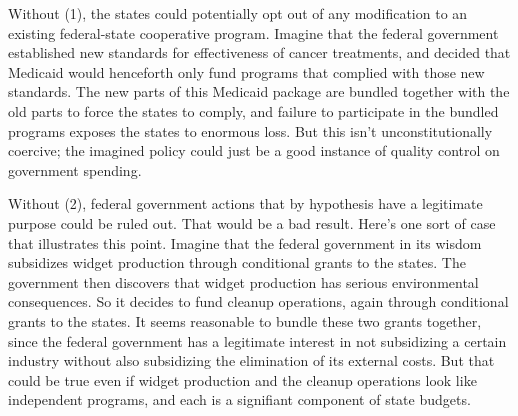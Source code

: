\documentclass[
  11pt,
  letterpaper,
  DIV=11,
  numbers=noendperiod,
  oneside]{scrartcl}
\begin{document}
Without (1), the states could potentially opt out of any modification to
an existing federal-state cooperative program. Imagine that the federal
government established new standards for effectiveness of cancer
treatments, and decided that Medicaid would henceforth only fund
programs that complied with those new standards. The new parts of this
Medicaid package are bundled together with the old parts to force the
states to comply, and failure to participate in the bundled programs
exposes the states to enormous loss. But this isn't unconstitutionally
coercive; the imagined policy could just be a good instance of quality
control on government spending.

Without (2), federal government actions that by hypothesis have a
legitimate purpose could be ruled out. That would be a bad result.
Here's one sort of case that illustrates this point. Imagine that the
federal government in its wisdom subsidizes widget production through
conditional grants to the states. The government then discovers that
widget production has serious environmental consequences. So it decides
to fund cleanup operations, again through conditional grants to the
states. It seems reasonable to bundle these two grants together, since
the federal government has a legitimate interest in not subsidizing a
certain industry without also subsidizing the elimination of its
external costs. But that could be true even if widget production and the
cleanup operations look like independent programs, and each is a
signifiant component of state budgets.
\end{document}

